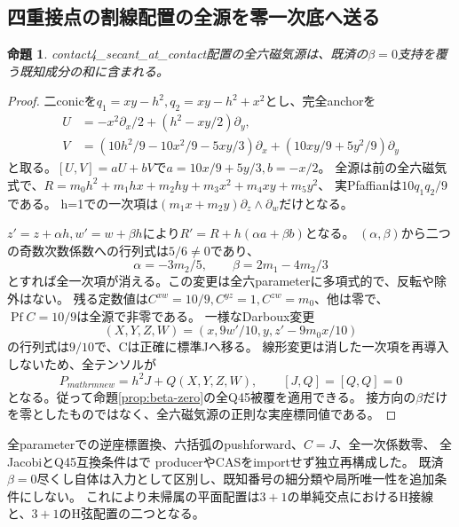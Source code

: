 \documentclass[a4paper,11pt]{ltjsarticle}
\newtheorem{proposition}{命題}[section]
\theoremstyle{definition}
\begin{document}
\subsection{四重接点の割線配置の全源を零一次底へ送る}
\begin{proposition}\label{prop:two-conics-even-beta-zero}
contact4\_secant\_at\_contact配置の全六磁気源は、既済の$\beta=0$支持を覆う既知成分の和に含まれる。
\end{proposition}
\begin{proof}
二conicを$q_1=xy-h^2,q_2=xy-h^2+x^2$とし、完全anchorを
\[
\begin{aligned}
 U&=-x^2\partial_x/2+(h^2-xy/2)\partial_y,\\
 V&=(10h^2/9-10x^2/9-5xy/3)\partial_x
          +(10xy/9+5y^2/9)\partial_y
\end{aligned}
\]
と取る。$[U,V]=aU+bV$で$a=10x/9+5y/3,b=-x/2$。
全源は前の全六磁気式で、$R=m_0h^2+m_1hx+m_2hy+m_3x^2+m_4xy+m_5y^2$、
実Pfaffianは$10q_1q_2/9$である。
h=1での一次項は$(m_1x+m_2y)\partial_z\wedge\partial_w$だけとなる。

$z'=z+\alpha h,w'=w+\beta h$により$R'=R+h(\alpha a+\beta b)$となる。
$(\alpha,\beta)$から二つの奇数次数係数への行列式は$5/6\ne0$であり、
\[
 \alpha=-3m_2/5,\qquad\beta=2m_1-4m_2/3
\]
とすれば全一次項が消える。この変更は全六parameterに多項式的で、反転や除外はない。
残る定数値は$C^{xw}=10/9,C^{yz}=1,C^{zw}=m_0$、他は零で、
$\operatorname{Pf}C=10/9$は全源で非零である。
一様なDarboux変更
\[
 (X,Y,Z,W)=(x,9w'/10,y,z'-9m_0x/10)
\]
の行列式は$9/10$で、Cは正確に標準Jへ移る。
線形変更は消した一次項を再導入しないため、全テンソルが
\[
 P_{mathrm{new}}=h^2J+Q(X,Y,Z,W),\qquad[J,Q]=[Q,Q]=0
\]
となる。従って命題\ref{prop:beta-zero}の全Q45被覆を適用できる。
接方向の$\beta$だけを零としたものではなく、全六磁気源の正則な実座標同値である。
\end{proof}
全parameterでの逆座標置換、六括弧のpushforward、$C=J$、全一次係数零、
全JacobiとQ45互換条件はで
producerやCASをimportせず独立再構成した。
既済$\beta=0$尽くし自体は入力として区別し、既知番号の細分類や局所唯一性を追加条件にしない。
これにより未帰属の平面配置は$3+1$の単純交点におけるH接線と、$3+1$のH弦配置の二つとなる。
\end{document}
